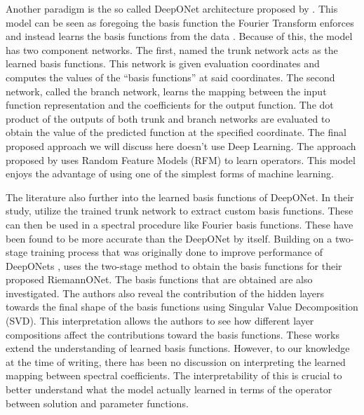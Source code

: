 Another paradigm is the so called DeepONet architecture proposed by \textcite{luLearningNonlinearOperators2021}. This model can be seen as foregoing the basis function the Fourier Transform enforces and instead learns the basis functions from the data \autocite{meurisMachinelearningbasedSpectralMethods2023}. Because of this, the model has two component networks. The first, named the trunk network acts as the learned basis functions. This network is given evaluation coordinates and computes the values of the \enquote{basis functions} at said coordinates. The second network, called the branch network, learns the mapping between the input function representation and the coefficients for the output function. The dot product of the outputs of both trunk and branch networks are evaluated to obtain the value of the predicted function at the specified coordinate. The final proposed approach we will discuss here doesn't use Deep Learning. The approach proposed by \textcite{nelsenOperatorLearningUsing2024} uses Random Feature Models (RFM) to learn operators. This model enjoys the advantage of using one of the simplest forms of machine learning.

The literature also further into the learned basis functions of DeepONet. In their study, \textcite{meurisMachinelearningbasedSpectralMethods2023} utilize the trained trunk network to extract custom basis functions. These can then be used in a spectral procedure like Fourier basis functions. These have been found to be more accurate than the DeepONet by itself. Building on a two-stage training process that was originally done to improve performance of DeepONets \autocite{leeTrainingGeneralizationDeep2024}, \textcite{peyvanRiemannONetsInterpretableNeural2024} uses the two-stage method to obtain the basis functions for their proposed RiemannONet. The basis functions that are obtained are also investigated. The authors also reveal the contribution of the hidden layers towards the final shape of the basis functions using Singular Value Decomposition (SVD). This interpretation allows the authors to see how different layer compositions affect the contributions toward the basis functions. These works extend the understanding of learned basis functions. However, to our knowledge at the time of writing, there has been no discussion on interpreting the learned mapping between spectral coefficients. The interpretability of this is crucial to better understand what the model actually learned in terms of the operator between solution and parameter functions.

